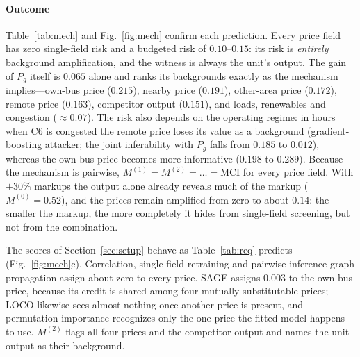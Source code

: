 \paragraph{Outcome}
Table~\ref{tab:mech} and Fig.~\ref{fig:mech} confirm each prediction. Every price field has zero
single-field risk and a budgeted risk of $0.10$--$0.15$: its risk is \emph{entirely} background
amplification, and the witness is always the unit's output. The gain of $P_g$ itself is $0.065$ alone
and ranks its backgrounds exactly as the mechanism implies---own-bus price ($0.215$), nearby price
($0.191$), other-area price ($0.172$), remote price ($0.163$), competitor output ($0.151$), and
loads, renewables and congestion ($\approx0.07$). The risk also depends on the operating regime: in
hours when C6 is congested the remote price loses its value as a background (gradient-boosting attacker; the joint inferability
with $P_g$ falls from $0.185$ to $0.012$), whereas the own-bus price becomes more informative ($0.198$ to
$0.289$). Because the mechanism is pairwise, $M^{(1)}=M^{(2)}=\dots=\mathrm{MCI}$ for every price field.
With $\pm30\%$ markups the output alone already reveals much of the markup ($M^{(0)}=0.52$), and the
prices remain amplified from zero to about $0.14$: the smaller the markup, the more completely it
hides from single-field screening, but not from the combination.

The scores of Section~\ref{sec:setup} behave as Table~\ref{tab:req} predicts (Fig.~\ref{fig:mech}c).
Correlation, single-field retraining and pairwise inference-graph propagation assign about zero to
every price. SAGE assigns $0.003$ to the own-bus price, because its credit is shared among four
mutually substitutable prices; LOCO likewise sees almost nothing once another price is present, and
permutation importance recognizes only the one price the fitted model happens to use. $M^{(2)}$ flags
all four prices and the competitor output and names the unit output as their background.

\begin{table}[!t]
\centering\footnotesize
\caption{Controlled mechanism (markup $\pm5\%$): exact field risk over all 2,047 subsets.}\label{tab:mech}
\end{table}

